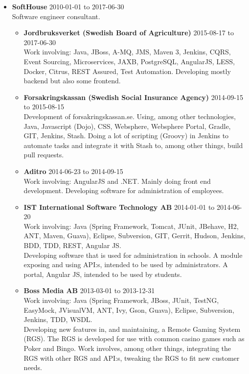 \documentclass[a4paper]{article}
\begin{document}
\begin{itemize}
 \item \textbf{SoftHouse} 2010-01-01 to 2017-06-30 \\
 Software engineer consultant.
 \begin{itemize}
  \item \textbf{Jordbruksverket (Swedish Board of Agriculture)} 2015-08-17 to 2017-06-30 \\
  Work involving: Java, JBoss, A-MQ, JMS, Maven 3, Jenkins, CQRS, Event Sourcing, Microservices, JAXB, PostgreSQL, AngularJS, LESS, Docker, Citrus, REST Assured, Test Automation.
  Developing mostly backend but also some frontend.
  
  \item \textbf{Forsakringskassan (Swedish Social Insurance Agency)} 2014-09-15 to 2015-08-15 \\
  Development of forsakringskassan.se. Using, among other technologies, Java, Javascript (Dojo), CSS, Websphere, Websphere Portal, Gradle, GIT, Jenkins, Stash. Doing a lot of scripting (Groovy) in Jenkins to automate tasks and integrate it with Stash to, among other things, build pull requests.
  
  \item \textbf{Aditro} 2014-06-23 to 2014-09-15 \\
  Work involving: AngularJS and .NET. Mainly doing front end development.
  Developing software for administration of employees.
  
  \item \textbf{IST International Software Technology AB} 2014-01-01 to 2014-06-20 \\
  Work involving: Java (Spring Framework, Tomcat, JUnit, JBehave, H2, ANT, Maven, Guava), Eclipse, Subversion, GIT, Gerrit, Hudson, Jenkins, BDD, TDD, REST, Angular JS. \\
  Developing software that is used for administration in schools. A module exposing and using API:s, intended to be used by administrators. A portal, Angular JS, intended to be used by students.
  
  \item \textbf{Boss Media AB} 2013-03-01 to 2013-12-31 \\
  Work involving: Java (Spring Framework, JBoss, JUnit, TestNG, EasyMock, JVisualVM, ANT, Ivy, Gson, Guava), Eclipse, Subversion, Jenkins, TDD, WSDL. \\
  Developing new features in, and maintaining, a Remote Gaming System (RGS). The RGS is developed for use with common casino games such as Poker and Bingo. Work involves, among other things, integrating the RGS with other RGS and API:s, tweaking the RGS to fit new customer needs.
  

\end{itemize}
\end{itemize}
\end{document}

